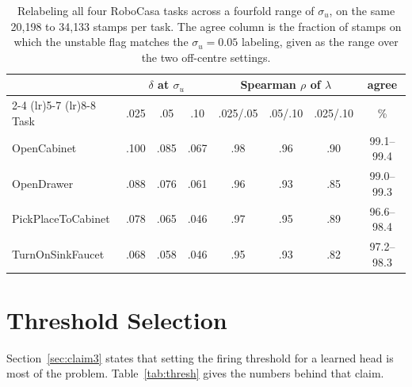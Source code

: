 \begin{table}[h]
\centering
\small
\setlength{\tabcolsep}{4pt}
\begin{tabular}{lccccccc}
\toprule
& \multicolumn{3}{c}{$\delta$ at $\sigma_u$} & \multicolumn{3}{c}{Spearman $\rho$ of $\lambda$} & agree \\
\cmidrule(lr){2-4} \cmidrule(lr){5-7} \cmidrule(lr){8-8}
Task & .025 & .05 & .10 & \tiny .025/.05 & \tiny .05/.10 & \tiny .025/.10 & \% \\
\midrule
OpenCabinet & .100 & .085 & .067 & .98 & .96 & .90 & 99.1--99.4 \\
OpenDrawer & .088 & .076 & .061 & .96 & .93 & .85 & 99.0--99.3 \\
PickPlaceToCabinet & .078 & .065 & .046 & .97 & .95 & .89 & 96.6--98.4 \\
TurnOnSinkFaucet & .068 & .058 & .046 & .95 & .93 & .82 & 97.2--98.3 \\
\bottomrule
\end{tabular}
\caption{Relabeling all four RoboCasa tasks across a fourfold range of
$\sigma_u$, on the same 20{,}198 to 34{,}133 stamps per task. The agree column
is the fraction of stamps on which the unstable flag matches the
$\sigma_u{=}0.05$ labeling, given as the range over the two off-centre
settings.}
\label{tab:sigmasweep}
\end{table}

\section{Threshold Selection}
\label{app:threshold}

Section~\ref{sec:claim3} states that setting the firing threshold for a learned
head is most of the problem. Table~\ref{tab:thresh} gives the numbers behind
that claim.

